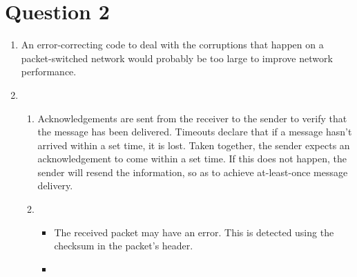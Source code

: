 \documentclass{article}
\begin{document}
\section*{Question 2}
\begin{enumerate}
  \item An error-correcting code to deal with the corruptions that happen on a packet-switched network would probably be too large to improve network performance.
  \item
    \begin{enumerate}
      \item Acknowledgements are sent from the receiver to the sender to verify that the message has been delivered. Timeouts declare that if a message hasn't arrived within a set time, it is lost. Taken together, the sender expects an acknowledgement to come within a set time. If this does not happen, the sender will resend the information, so as to achieve at-least-once message delivery.
      \item
        \begin{itemize}
          \item The received packet may have an error. This is detected using the checksum in the packet's header.
          \item 
        \end{itemize}


\end{enumerate}
\end{enumerate}
\end{document}
